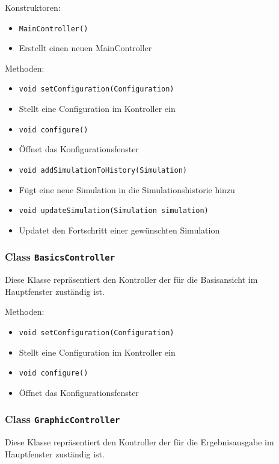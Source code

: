 \documentclass[parskip=full,11pt]{scrartcl}
\begin{document}
Konstruktoren:
\begin{itemize}\itemsep -10pt
\item \texttt{MainController()}
\item[] Erstellt einen neuen MainController
\end{itemize}

Methoden:
\begin{itemize}\itemsep -10pt
\item \texttt{void setConfiguration(Configuration)}
\item[] Stellt eine Configuration im Kontroller ein


\item \texttt{void configure()}
\item[] Öffnet das Konfigurationsfenster

\item \texttt{void addSimulationToHistory(Simulation)}
\item[] Fügt eine neue Simulation in die Simulationshistorie hinzu

\item \texttt{void updateSimulation(Simulation simulation)}
\item[] Updatet den Fortschritt einer gewünschten Simulation
\end{itemize}

\subsubsection{Class \texttt{BasicsController}}
Diese Klasse repräsentiert den Kontroller der für die Basisansicht im Hauptfenster zuständig ist.

Methoden:
\begin{itemize}\itemsep -10pt
\item \texttt{void setConfiguration(Configuration)}
\item[] Stellt eine Configuration im Kontroller ein


\item \texttt{void configure()}
\item[] Öffnet das Konfigurationsfenster
\end{itemize}

\subsubsection{Class \texttt{GraphicController}}
Diese Klasse repräsentiert den Kontroller der für die Ergebnisausgabe im Hauptfenster zuständig ist.
\end{document}
